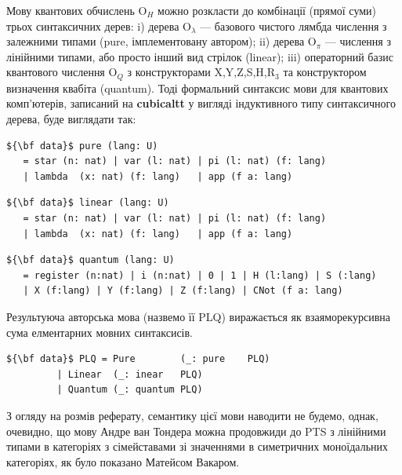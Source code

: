 \documentclass{article}
\theoremstyle{definition}
\begin{document}
Мову квантових обчислень O$_H$ можно розкласти до комбінації (прямої суми) трьох синтаксичних дерев:
  i) дерева O$_\lambda$ --- базового чистого лямбда числення з залежними типами (pure, імплементовану автором\cite{Tonpa18});
 ii) дерева O$_\pi$ --- числення з лінійними типами, або просто інший вид стрілок (linear);
iii) операторний базис квантового числення O$_Q$ з
     конструкторами X,Y,Z,S,H,R$_3$ та конструктором визначення квабіта (quantum).
Тоді формальний синтаксис мови для квантових комп'ютерів,
записаний на {\bf cubicaltt}\cite{Mortberg17} у вигляді індуктивного типу синтаксичного дерева,
буде виглядати так:
\begin{lstlisting}[mathescape=true]
${\bf data}$ pure (lang: U)
   = star (n: nat) | var (l: nat) | pi (l: nat) (f: lang)
   | lambda  (x: nat) (f: lang)   | app (f a: lang)
\end{lstlisting}
\begin{lstlisting}[mathescape=true]
${\bf data}$ linear (lang: U)
   = star (n: nat) | var (l: nat) | pi (l: nat) (f: lang)
   | lambda  (x: nat) (f: lang)   | app (f a: lang)
\end{lstlisting}
\begin{lstlisting}[mathescape=true]
${\bf data}$ quantum (lang: U)
   = register (n:nat) | i (n:nat) | 0 | 1 | H (l:lang) | S (:lang)
   | X (f:lang) | Y (f:lang) | Z (f:lang) | CNot (f a: lang)
\end{lstlisting}
Результуюча авторська мова (назвемо її PLQ) виражається
як взаяморекурсивна сума елментарних мовних синтаксисів.
\begin{lstlisting}[mathescape=true]
${\bf data}$ PLQ = Pure        (_: pure    PLQ)
         | Linear  (_: inear   PLQ)
         | Quantum (_: quantum PLQ)
\end{lstlisting}
З огляду на розмів реферату, семантику цієї мови наводити не будемо,
однак, очевидно, що мову Андре ван Тондера можна продовжиди до
PTS з лінійними типами в категоріях з сімейставами зі значеннями в симетричних моноїдальних категоріях,
як було показано Матейсом Вакаром\cite{Vakar2014}.
\newpage


\end{document}
